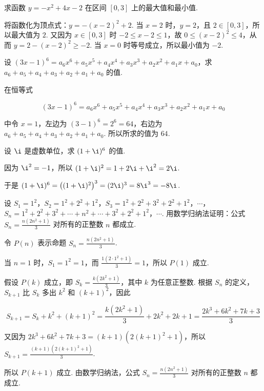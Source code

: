 \begin{problem}

求函数 \(y = -x^{2} + 4x - 2\) 在区间 \([0,3]\) 上的最大值和最小值.
\end{problem}

\begin{solution}
将函数化为顶点式：\(y=-\left(x-2\right)^2+2\). 当 \(x=2\) 时，\(y=2\)，且 \(2\in[0,3]\)，所以最大值为 \(2\). 又因为 \(x\in[0,3]\) 时 \(-2\leqslant x-2\leqslant1\)，故 \(0\leqslant\left(x-2\right)^2\leqslant4\)，从而 \(y=2-\left(x-2\right)^2\geqslant-2\). 当 \(x=0\) 时等号成立，所以最小值为 \(-2\).
\end{solution}

\begin{problem}

设 \((3x-1)^6=a_6x^6+a_5x^5+a_4x^4+a_3x^3+a_2x^2+a_1x+a_0\)，求 \(a_6+a_5+a_4+a_3+a_2+a_1+a_0\) 的值.
\end{problem}

\begin{solution}
在恒等式

\[
(3x-1)^6=a_6x^6+a_5x^5+a_4x^4+a_3x^3+a_2x^2+a_1x+a_0
\]

中令 \(x=1\)，左边为 \((3-1)^6=2^6=64\)，右边为 \(a_6+a_5+a_4+a_3+a_2+a_1+a_0\). 所以所求的值为 \(64\).
\end{solution}

\begin{problem}

设 \(\i\) 是虚数单位，求 \((1+\i)^6\) 的值.
\end{problem}

\begin{solution}
因为 \(\i^2=-1\)，所以 \((1+\i)^2=1+2\i+\i^2=2\i\).

于是 \((1+\i)^6=\left((1+\i)^2\right)^3=(2\i)^3=8\i^3=-8\i\).
\end{solution}

\begin{problem}

设 \(S_1=1^2\)，\(S_2=1^2+2^2+1^2\)，\(S_3=1^2+2^2+3^2+2^2+1^2\)，\(\cdots\)，\(S_n=1^2+2^2+3^2+\cdots+n^2+\cdots+3^2+2^2+1^2\)，\(\cdots\). 用数学归纳法证明：公式 \(S_n=\frac{n(2n^2+1)}{3}\) 对所有的正整数 \(n\) 都成立.
\end{problem}

\begin{solution}
令 \(P(n)\) 表示命题 \(S_n=\frac{n(2n^2+1)}{3}\).

当 \(n=1\) 时，\(S_1=1^2=1\)，而 \(\frac{1(2\cdot1^2+1)}{3}=1\)，所以 \(P(1)\) 成立.

假设 \(P(k)\) 成立，即 \(S_k=\frac{k(2k^2+1)}{3}\)，其中 \(k\) 为任意正整数. 根据 \(S_n\) 的定义，\(S_{k+1}\) 比 \(S_k\) 多出 \(k^2\) 和 \((k+1)^2\)，因此

\[
S_{k+1}=S_k+k^2+\left(k+1\right)^2
=\frac{k\left(2k^2+1\right)}{3}+2k^2+2k+1
=\frac{2k^3+6k^2+7k+3}{3}
\]

又因为 \(2k^3+6k^2+7k+3=\left(k+1\right)\left(2\left(k+1\right)^2+1\right)\)，所以
\(S_{k+1}=\frac{\left(k+1\right)\left(2\left(k+1\right)^2+1\right)}{3}\).

所以 \(P(k+1)\) 成立. 由数学归纳法，公式 \(S_n=\frac{n(2n^2+1)}{3}\) 对所有的正整数 \(n\) 都成立.
\end{solution}

